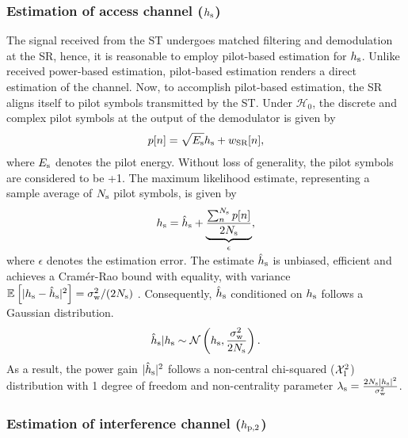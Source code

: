 \subsubsection{Estimation of access channel ($h_{\text{s}}$)}
The signal received from the ST undergoes matched filtering and demodulation at the SR, hence, it is reasonable to employ pilot-based estimation for $h_{\text{s}}$. Unlike received power-based estimation, pilot-based estimation renders a direct estimation of the channel. 
Now, to accomplish pilot-based estimation, the SR aligns itself to pilot symbols transmitted by the ST. Under $\mathcal H_0$, the discrete and complex pilot symbols at the output of the demodulator is given by \cite{Gifford08} 
\begin{align}
p[n] = \sqrt{E_{\text{s}}} h_{\text{s}} + w_{\text{SR}}[n], 
\label{eq_IS:pilot_sig}
\end{align}
where $E_{\text{s}}$ denotes the pilot energy. Without loss of generality, the pilot symbols are considered to be +1. The maximum likelihood estimate, representing a sample average of $N_{\text{s}}$ pilot symbols, is given by \cite{Gifford05}
\begin{align}
h_{\text{s}} = \hat{h}_{\text{s}} + \smash[b]{\underbrace{\frac{\sum^{N_{\text{s}}}_{n} p[n]}{2 N_{\text{s}}}}_{\epsilon}},
\label{eq_IS:pilot_MLE}
\end{align}\\[-0.00em]
where $\epsilon$ denotes the estimation error. 
The estimate $\hat{h}_{\text{s}}$ is unbiased, efficient and achieves a Cram\'er-Rao bound with equality, with variance ${\mathbb E}_{}\left[ |h_{\text{s}} -\hat{h}_{\text{s}}|^2 \right] = \sigma^2_{\text{w}}/(2 N_{\text{s}})$ \cite{Gifford08}. Consequently, $\hat{h}_{\text{s}}$ conditioned on $h_{\text{s}}$ follows a Gaussian distribution.
\begin{align}
\hat{h}_{\text{s}}|h_{\text{s}} \sim \mathcal{N}\left( h_{\text{s}},\frac{\sigma^2_{\text{w}}}{2 N_{\text{s}}} \right).
\label{eq_IS:ehs} 
\end{align}
As a result, the power gain $|\hat{h}_{\text{s}}|^2$ follows a non-central chi-squared ($\ncchi2$) distribution with 1 degree of freedom and non-centrality parameter $\lambda_{\text{s}} = \frac{2 N_{\text{s}} |h_{\text{s}}|^2}{\sigma^2_{\text{w}}}$.  

\subsubsection{Estimation of interference channel ($h_{\text{p,2}}$)}


